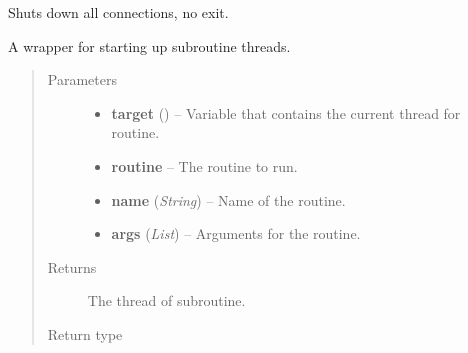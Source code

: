 \documentclass[letterpaper,10pt,english]{sphinxmanual}
\begin{document}
\begin{fulllineitems}
\begin{fulllineitems}
\begin{quote}
\begin{description}
\end{description}\end{quote}

\end{fulllineitems}


\begin{fulllineitems}
\label{swnp:swnp.SWNP.shutdown}
Shuts down all connections, no exit.

\end{fulllineitems}


\begin{fulllineitems}
\label{swnp:swnp.SWNP.start_sub_routine}
A wrapper for starting up subroutine threads.
\begin{quote}\begin{description}
\item[{Parameters}] \leavevmode\begin{itemize}
\item {} 
\textbf{target} () -- Variable that contains the current thread for routine.

\item {} 
\textbf{routine} -- The routine to run.

\item {} 
\textbf{name} (\emph{String}) -- Name of the routine.

\item {} 
\textbf{args} (\emph{List}) -- Arguments for the routine.

\end{itemize}

\item[{Returns}] \leavevmode
The thread of subroutine.

\item[{Return type}] \leavevmode
{}

\end{description}\end{quote}

\end{fulllineitems}



\end{fulllineitems}
\end{document}

